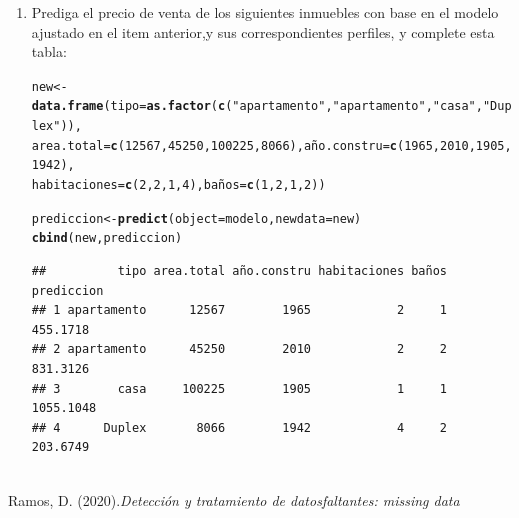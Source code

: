 \documentclass[9pt,letterpaper]{article}\usepackage[]{graphicx}\usepackage[]{color}
\makeatletter
\newcommand{\hlnum}[1]{\textcolor[rgb]{0.686,0.059,0.569}{#1}}%
\newcommand{\hlstr}[1]{\textcolor[rgb]{0.192,0.494,0.8}{#1}}%
\newcommand{\hlstd}[1]{\textcolor[rgb]{0.345,0.345,0.345}{#1}}%
\newcommand{\hlkwb}[1]{\textcolor[rgb]{0.69,0.353,0.396}{#1}}%
\newcommand{\hlkwc}[1]{\textcolor[rgb]{0.333,0.667,0.333}{#1}}%
\newcommand{\hlkwd}[1]{\textcolor[rgb]{0.737,0.353,0.396}{\textbf{#1}}}%
\newenvironment{kframe}{%
 \def\at@end@of@kframe{}%
 \ifinner\ifhmode%
  \def\at@end@of@kframe{\end{minipage}}%
  \begin{minipage}{\columnwidth}%
 \fi\fi%
 \def\FrameCommand##1{\hskip\@totalleftmargin \hskip-\fboxsep
 \colorbox{shadecolor}{##1}\hskip-\fboxsep
     \hskip-\linewidth \hskip-\@totalleftmargin \hskip\columnwidth}%
 \MakeFramed {\advance\hsize-\width
   \@totalleftmargin\z@ \linewidth\hsize
   \@setminipage}}%
 {\par\unskip\endMakeFramed%
 \at@end@of@kframe}
\newenvironment{knitrout}{}{} %
\makeatother
\begin{document}
\begin{enumerate}
    \item Prediga el precio de venta de los siguientes inmuebles con base en el modelo ajustado en el item anterior,y sus correspondientes perfiles, y complete esta tabla:
\begin{knitrout}
\color{fgcolor}\begin{kframe}
\begin{alltt}
\hlstd{new}\hlkwb{<-}\hlkwd{data.frame}\hlstd{(}\hlkwc{tipo}\hlstd{=}\hlkwd{as.factor}\hlstd{(}\hlkwd{c}\hlstd{(}\hlstr{"apartamento"}\hlstd{,}\hlstr{"apartamento"}\hlstd{,}\hlstr{"casa"}\hlstd{,}\hlstr{"Duplex"}\hlstd{)),}
\hlkwc{area.total}\hlstd{=}\hlkwd{c}\hlstd{(}\hlnum{12567}\hlstd{,}\hlnum{45250}\hlstd{,}\hlnum{100225}\hlstd{,}\hlnum{8066}\hlstd{),}\hlkwc{año.constru}\hlstd{=}\hlkwd{c}\hlstd{(}\hlnum{1965}\hlstd{,}\hlnum{2010}\hlstd{,}\hlnum{1905}\hlstd{,}\hlnum{1942}\hlstd{),}
\hlkwc{habitaciones}\hlstd{=}\hlkwd{c}\hlstd{(}\hlnum{2}\hlstd{,}\hlnum{2}\hlstd{,}\hlnum{1}\hlstd{,}\hlnum{4}\hlstd{),}\hlkwc{baños}\hlstd{=}\hlkwd{c}\hlstd{(}\hlnum{1}\hlstd{,}\hlnum{2}\hlstd{,}\hlnum{1}\hlstd{,}\hlnum{2}\hlstd{))}

\hlstd{prediccion}\hlkwb{<-}\hlkwd{predict}\hlstd{(}\hlkwc{object} \hlstd{= modelo,}\hlkwc{newdata} \hlstd{= new)}
\hlkwd{cbind}\hlstd{(new,prediccion)}
\end{alltt}
\begin{verbatim}
##          tipo area.total año.constru habitaciones baños prediccion
## 1 apartamento      12567        1965            2     1   455.1718
## 2 apartamento      45250        2010            2     2   831.3126
## 3        casa     100225        1905            1     1  1055.1048
## 4      Duplex       8066        1942            4     2   203.6749
\end{verbatim}
\end{kframe}
\end{knitrout}
    
\end{enumerate}




\\
Ramos, D.  (2020).\textit{Detección y tratamiento de datosfaltantes: missing data}
\end{document}
